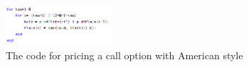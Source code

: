 \documentclass[sigconf]{acmart}
\begin{document}
\begin{figure}[htbp]
    \centering
    \includegraphics[width=0.35\textwidth]{24.png}
    \caption{\label{}The code for pricing a call option with American style}
\end{figure}



\end{document}
